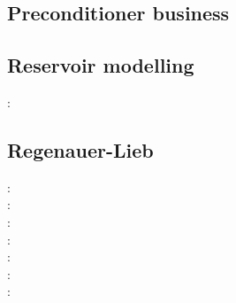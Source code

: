 \subsection{Preconditioner business}

\begin{scriptsize}
\cite{benz02}
\cite{bewa08}
\cite{urvs08}
\end{scriptsize}

\subsection{Reservoir modelling}

\begin{scriptsize}
\twothousandthirteen: \textcite{orwa13}
\end{scriptsize}

\subsection{Regenauer-Lieb}

{\scriptsize
\twothousand: \cite{reyu98}\\
\twothousand: \cite{reyu00}\\
\twothousandthree: \cite{reyu03}\\
\twothousandfour: \cite{reyu04}\\
\twothousandsix: \cite{rehy06}\cite{rewr06}\\
\twothousandnine: \cite{reps09}\\
\twothousandthirteen: \cite{revp13}
}

